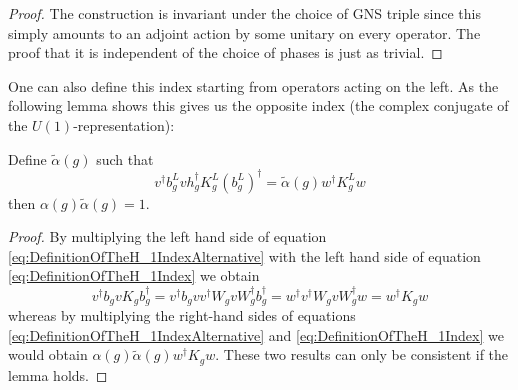 \documentclass[11pt,a4paper,twoside]{article}
\numberwithin{equation}{section}
\begin{document}
	\begin{proof}
		The construction is invariant under the choice of GNS triple since this simply amounts to an adjoint action by some unitary on every operator. The proof that it is independent of the choice of phases is just as trivial.
	\end{proof}
	One can also define this index starting from operators acting on the left. As the following lemma shows this gives us the opposite index (the complex conjugate of the $U(1)$-representation):
	\begin{lemma}
		Define $\tilde{\alpha}(g)$ such that
		\begin{equation}\label{eq:DefinitionOfTheH_1IndexAlternative}
			v^\dagger b_g^L v h_g^\dagger K_g^L (b_g^L)^\dagger=\tilde{\alpha}(g)w^\dagger K_g^L w
		\end{equation}
		then $\alpha(g)\tilde{\alpha}(g)=1$.
	\end{lemma}
	\begin{proof}
		By multiplying the left hand side of equation \eqref{eq:DefinitionOfTheH_1IndexAlternative} with the left hand side of equation \eqref{eq:DefinitionOfTheH_1Index} we obtain
		\begin{equation}
			v^\dagger b_g v K_g b_g^\dagger=v^\dagger b_g v v^\dagger W_g v W_g^\dagger b_g^\dagger=w^\dagger v^\dagger W_g v W_g^\dagger w=w^\dagger K_g w
		\end{equation}
		whereas by multiplying the right-hand sides of equations \eqref{eq:DefinitionOfTheH_1IndexAlternative} and \eqref{eq:DefinitionOfTheH_1Index} we would obtain $\alpha(g)\tilde{\alpha}(g)w^\dagger K_g w$. These two results can only be consistent if the lemma holds.
	\end{proof}
\end{document}
